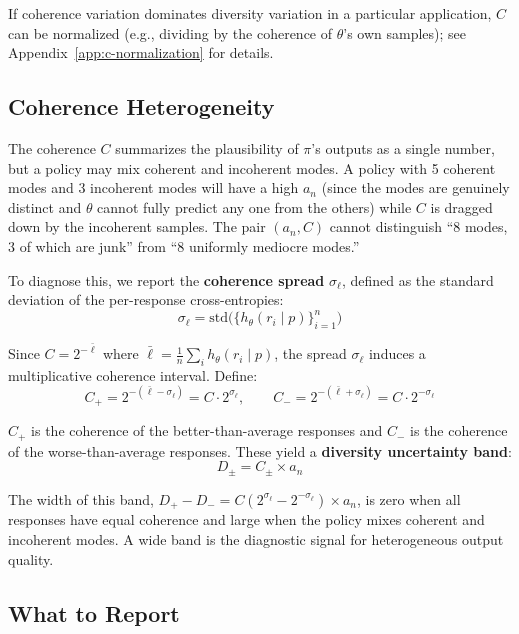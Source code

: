 If coherence variation dominates diversity variation in a particular application, $C$ can be normalized (e.g., dividing by the coherence of $\theta$'s own samples); see Appendix~\ref{app:c-normalization} for details.

\subsection{Coherence Heterogeneity}\label{sec:coherence-hetero}

The coherence $C$ summarizes the plausibility of $\pi$'s outputs as a single number, but a policy may mix coherent and incoherent modes.
A policy with 5 coherent modes and 3 incoherent modes will have a high $a_n$ (since the modes are genuinely distinct and $\theta$ cannot fully predict any one from the others) while $C$ is dragged down by the incoherent samples.
The pair $(a_n, C)$ cannot distinguish ``8 modes, 3 of which are junk'' from ``8 uniformly mediocre modes.''

To diagnose this, we report the \textbf{coherence spread} $\sigma_\ell$, defined as the standard deviation of the per-response cross-entropies:
\begin{equation}
    \sigma_\ell = \mathrm{std}\bigl(\{h_\theta(r_i \mid p)\}_{i=1}^n\bigr)
\end{equation}

Since $C = 2^{-\bar{\ell}}$ where $\bar{\ell} = \frac{1}{n}\sum_i h_\theta(r_i \mid p)$, the spread $\sigma_\ell$ induces a multiplicative coherence interval.
Define:
\begin{equation}
    C_+ = 2^{-(\bar{\ell} - \sigma_\ell)} = C \cdot 2^{\sigma_\ell}, \qquad C_- = 2^{-(\bar{\ell} + \sigma_\ell)} = C \cdot 2^{-\sigma_\ell}
\end{equation}

$C_+$ is the coherence of the better-than-average responses and $C_-$ is the coherence of the worse-than-average responses.
These yield a \textbf{diversity uncertainty band}:
\begin{equation}
    D_\pm = C_\pm \times a_n
\end{equation}

The width of this band, $D_+ - D_- = C(2^{\sigma_\ell} - 2^{-\sigma_\ell}) \times a_n$, is zero when all responses have equal coherence and large when the policy mixes coherent and incoherent modes.
A wide band is the diagnostic signal for heterogeneous output quality.

\subsection{What to Report}

